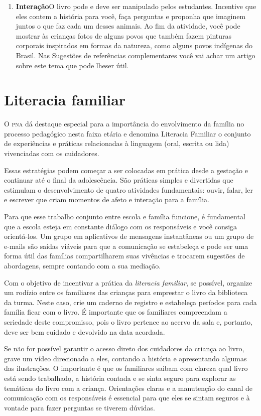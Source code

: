 \documentclass[11pt]{extarticle}
\begin{document}
\begin{enumerate}
\item \textbf{Interação}\quad O livro pode e deve ser 
manipulado pelos estudantes. Incentive que eles contem a história para 
você, faça perguntas e proponha que imaginem juntos o que faz
cada um desses animais. Ao fim da atividade, você pode mostrar às crianças
fotos de alguns povos que também fazem pinturas corporais inspirados 
em formas da natureza, como alguns povos indígenas do Brasil. Nas Sugestões
de referências complementares você vai achar um artigo sobre este tema que 
pode lheser útil.
\end{enumerate}


\section{Literacia familiar}
O \textsc{pna} dá destaque especial para a importância do envolvimento da família 
no processo pedagógico nesta faixa etária e denomina Literacia Familiar o conjunto 
de experiências e práticas relacionadas à linguagem (oral, escrita ou lida) vivenciadas 
com os cuidadores. 

Essas estratégias podem começar a ser colocadas em prática desde a 
gestação e continuar até o final da adolescência. São práticas simples e divertidas 
que estimulam o desenvolvimento de quatro atividades fundamentais: ouvir, falar, 
ler e escrever que criam momentos de afeto e interação para a família. 

Para que esse trabalho conjunto entre escola e família funcione, é 
fundamental que a escola esteja em constante diálogo com os responsáveis e 
você consiga orientá-los. Um grupo em aplicativos de mensagens instantâneas ou um 
grupo de e-mails são saídas viáveis para que a comunicação se estabeleça e pode ser 
uma forma útil das famílias compartilharem suas vivências e trocarem sugestões 
de abordagens, sempre contando com a sua mediação. 

Com o objetivo de incentivar 
a prática da \textit{literacia familiar}, se possível, organize um rodízio entre os familiares 
das crianças para emprestar o livro da biblioteca da turma. Neste caso, crie um caderno 
de registro e estabeleça períodos para cada família ficar com o livro. É importante 
que os familiares compreendam a seriedade deste compromisso, pois o livro pertence 
ao acervo da sala e, portanto, deve ser bem cuidado e devolvido na data acordada. 

Se não for possível garantir o acesso direto dos cuidadores da criança ao livro, 
grave um vídeo direcionado a eles, contando a história e apresentando algumas 
das ilustrações. O importante é que os familiares saibam com clareza qual livro 
está sendo trabalhado, a história contada e se sinta seguro para explorar as temáticas 
do livro com a criança. Orientações claras e a manutenção do canal de comunicação com 
os responsáveis é essencial para que eles se sintam seguros e à vontade para fazer perguntas 
se tiverem dúvidas. 
\end{document}
